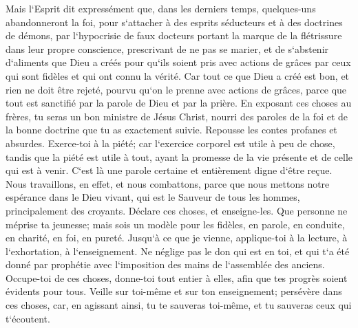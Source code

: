 \verse Mais l`Esprit dit expressément que, dans les derniers temps, quelques-uns abandonneront la foi, pour s`attacher à des esprits séducteurs et à des doctrines de démons, 
\verse par l`hypocrisie de faux docteurs portant la marque de la flétrissure dans leur propre conscience, 
\verse prescrivant de ne pas se marier, et de s`abstenir d`aliments que Dieu a créés pour qu`ils soient pris avec actions de grâces par ceux qui sont fidèles et qui ont connu la vérité. 
\verse Car tout ce que Dieu a créé est bon, et rien ne doit être rejeté, pourvu qu`on le prenne avec actions de grâces, 
\verse parce que tout est sanctifié par la parole de Dieu et par la prière. 
\verse En exposant ces choses au frères, tu seras un bon ministre de Jésus Christ, nourri des paroles de la foi et de la bonne doctrine que tu as exactement suivie. 
\verse Repousse les contes profanes et absurdes. 
\verse Exerce-toi à la piété; car l`exercice corporel est utile à peu de chose, tandis que la piété est utile à tout, ayant la promesse de la vie présente et de celle qui est à venir. 
\verse C`est là une parole certaine et entièrement digne d`être reçue. 
\verse Nous travaillons, en effet, et nous combattons, parce que nous mettons notre espérance dans le Dieu vivant, qui est le Sauveur de tous les hommes, principalement des croyants. 
\verse Déclare ces choses, et enseigne-les. 
\verse Que personne ne méprise ta jeunesse; mais sois un modèle pour les fidèles, en parole, en conduite, en charité, en foi, en pureté. 
\verse Jusqu`à ce que je vienne, applique-toi à la lecture, à l`exhortation, à l`enseignement. 
\verse Ne néglige pas le don qui est en toi, et qui t`a été donné par prophétie avec l`imposition des mains de l`assemblée des anciens. 
\verse Occupe-toi de ces choses, donne-toi tout entier à elles, afin que tes progrès soient évidents pour tous. 
\verse Veille sur toi-même et sur ton enseignement; persévère dans ces choses, car, en agissant ainsi, tu te sauveras toi-même, et tu sauveras ceux qui t`écoutent. 

\chapter{}

